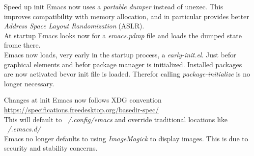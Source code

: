 \begin{frame}{Speed up init}
Emacs now uses a \emph{portable dumper} instead of unexec. This
improves compatibility with memory allocation, and in particular
provides better \emph{Address Space Layout Randomization} (ASLR).\\


  At startup Emacs looks now for a \emph{emacs.pdmp} file and loads
  the dumped state frome there. \\
  
  
  Emacs now loads, very early in the startup process, a
  \emph{early-init.el}. Just befor graphical elements and befor
  package manager is initialized. Installed packages are now activated
  bevor init file is loaded. Therefor calling
  \emph{package-initialize} is no longer necessary. \\
  
\end{frame}

\begin{frame}{Changes at init}
  Emacs now follows XDG convention \\

  \url{https://specifications.freedesktop.org/basedir-spec/} \\

  This will default to \emph{~/.config/emacs} and override traditional
  locations like \emph{~/.emacs.d/} \\
  
  Emacs no longer defaults to using \emph{ImageMagick} to display
  images. This is due to security and stability concerns. \\
  
\end{frame}

  
